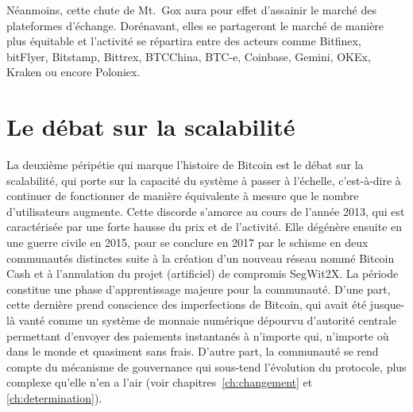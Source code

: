 Néanmoins, cette chute de Mt.~Gox aura pour effet d'assainir le marché des plateformes d'échange. Dorénavant, elles se partageront le marché de manière plus équitable et l'activité se répartira entre des acteurs comme Bitfinex, bitFlyer, Bitstamp, Bittrex, BTCChina, BTC-e, Coinbase, Gemini, OKEx, Kraken ou encore Poloniex.

\section*{Le débat sur la scalabilité} %

La deuxième péripétie qui marque l'histoire de Bitcoin est le débat sur la scalabilité, qui porte sur la capacité du système à passer à l'échelle, c'est-à-dire à continuer de fonctionner de manière équivalente à mesure que le nombre d'utilisateurs augmente. Cette discorde s'amorce au cours de l'année 2013, qui est caractérisée par une forte hausse du prix et de l'activité. Elle dégénère ensuite en une guerre civile en 2015, pour se conclure en 2017 par le schisme en deux communautés distinctes suite à la création d'un nouveau réseau nommé Bitcoin Cash et à l'annulation du projet (artificiel) de compromis SegWit2X. La période constitue une phase d'apprentissage majeure pour la communauté. D'une part, cette dernière prend conscience des imperfections de Bitcoin, qui avait été jusque-là vanté comme un système de monnaie numérique dépourvu d'autorité centrale permettant d'envoyer des paiements instantanés à n'importe qui, n'importe où dans le monde et quasiment sans frais. D'autre part, la communauté se rend compte du mécanisme de gouvernance qui sous-tend l'évolution du protocole, plus complexe qu'elle n'en a l'air (voir chapitres~\ref{ch:changement} et \ref{ch:determination}).

